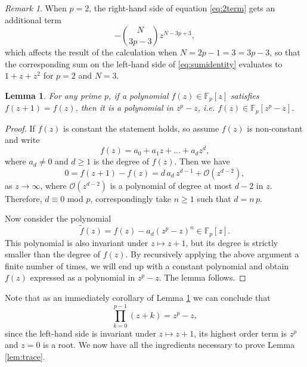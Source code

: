 \documentclass[a4paper,reqno]{amsart}
\numberwithin{equation}{section}
\newtheorem{lemma}[theorem]{Lemma}
\numberwithin{figure}{section}
\theoremstyle{remark}
\newtheorem{remark}[theorem]{Remark}
\begin{document}
\begin{remark}
    When $p=2$, the right-hand side of equation \eqref{eq:2term}  gets an additional term
    \begin{equation*}
        -\binom{N}{3p-3}z^{N-3p+3},
    \end{equation*}
    which affects the result of the calculation when $N=2p-1=3=3p-3$, so that the corresponding sum on the left-hand side of \eqref{eq:sumidentity} evaluates to $1+z+z^2$ for $p=2$ and $N=3$.
\end{remark}

\begin{lemma}\label{lem:invpol} For any prime $p$,
    if a polynomial $f(z)\in \mathbb{F}_p[z]$ satisfies $f(z+1)=f(z)$, then it is a polynomial in $z^p-z$, i.e. $f(z)\in\mathbb{F}_p[z^p-z]$.
\end{lemma}
\begin{proof}
    If $f(z)$ is constant the statement holds, so assume $f(z)$ is non-constant and write
    \begin{equation*}
        f(z)=a_0+a_1 z+\ldots+a_d z^d,
    \end{equation*}
    where $a_d\neq 0$ and $d\geq 1$ is the degree of $f(z)$. Then we have
    \begin{equation*}
        0=f(z+1)-f(z)=d\, a_d\,  z^{d-1}+\mathcal{O}(z^{d-2}),
    \end{equation*}
 as $z\rightarrow \infty$,   where $\mathcal{O}(z^{d-2})$ is a polynomial of degree at most $d-2$ in $z$. Therefore, $d\equiv0$ mod $p$, correspondingly take $n\geq 1$ such that $d=n\,p$.

    Now consider the polynomial
    \begin{equation*}
        \widetilde{f}(z)=f(z)-a_d(z^p-z)^n\in \mathbb{F}_p[z].
    \end{equation*}
    This polynomial is also invariant under $z\mapsto z+1$, but its degree is strictly smaller than the degree of $f(z)$. By recursively applying the above argument a finite number of times, we will end up with a constant polynomial and obtain $f(z)$ expressed as a polynomial in $z^p-z$. The lemma follows.
\end{proof}

Note that as an immediately corollary of Lemma \ref{lem:invpol} we can conclude that
    \begin{equation}\label{eq:polyproduct}
        \prod_{k=0}^{p-1} (z+k) = z^p - z,
    \end{equation}
since the left-hand side is invariant under $z\mapsto z+1$, its highest order term is $z^p$ and $z=0$ is a root.
We now have all the ingredients necessary to prove Lemma \ref{lem:trace}.
\end{document}
